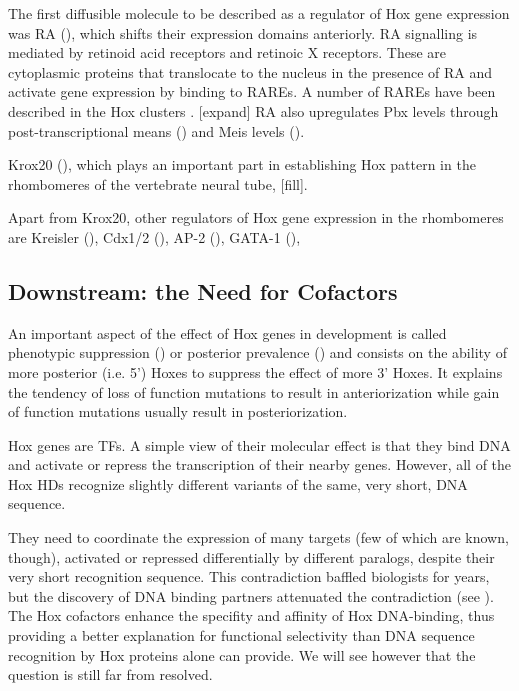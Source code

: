 The first diffusible molecule to be described as a regulator of Hox gene expression was \ac{RA} (\cite{Simeone1990}), which shifts their expression domains anteriorly. \ac{RA} signalling is mediated by retinoid acid receptors and retinoic X receptors. These are cytoplasmic proteins that translocate to the nucleus in the presence of \ac{RA} and activate gene expression by binding to \acp{RARE}. A number of \acp{RARE} have been described in the Hox clusters \cite{refs}. [expand] \ac{RA} also upregulates Pbx levels through post-transcriptional means (\cite{Knoepfler1997a}) and Meis levels (\cite{ref}).

Krox20 (\cite{Swiatek1993}), which plays an important part in establishing Hox pattern in the rhombomeres of the vertebrate neural tube, [fill].

Apart from Krox20, other regulators of Hox gene expression in the rhombomeres are Kreisler (\cite{ref}), Cdx1/2 (\cite{refs}), AP-2 (\cite{refs}), GATA-1 (\cite{ref}), %




\subsection{Downstream: the Need for Cofactors}

An important aspect of the effect of Hox genes in development is called phenotypic suppression (\cite{Gonzalez-Reyes1990}) or posterior prevalence (\cite{Lufkin1991}) and consists on the ability of more posterior (i.e. 5') Hoxes to suppress the effect of more 3' Hoxes. It explains the tendency of loss of function mutations to result in anteriorization while gain of function mutations usually result in posteriorization.

Hox genes are \acp{TF}. A simple view of their molecular effect is that they bind DNA and activate or repress the transcription of their nearby genes. However, all of the Hox \acp{HD} recognize slightly different  variants of the same, very short, DNA sequence. 

They need to coordinate the expression of many targets (few of which are known, though), activated or repressed differentially by different paralogs, despite their very short recognition sequence. This contradiction baffled biologists for years, but the discovery of DNA binding partners attenuated the contradiction (see \cite{Mann1996}). The Hox cofactors enhance the specifity and affinity of Hox DNA-binding, thus providing a better explanation for functional selectivity than DNA sequence recognition by Hox proteins alone can provide. We will see however that the question is still far from resolved. 

